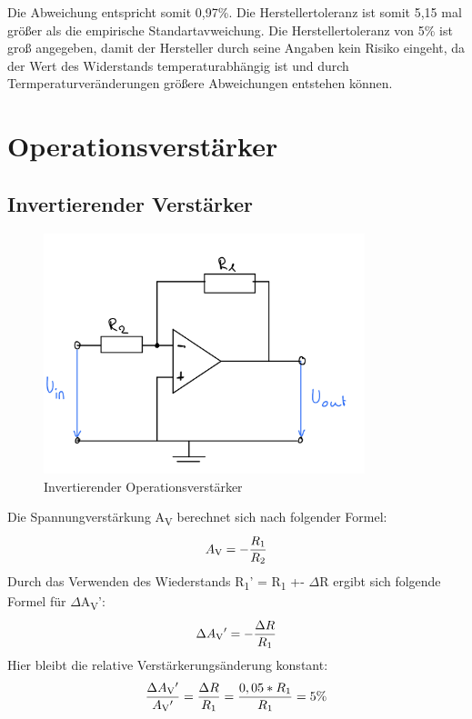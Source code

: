 Die Abweichung entspricht somit 0,97\%. Die Herstellertoleranz ist somit 5,15
mal größer als die empirische Standartavweichung. Die Herstellertoleranz 
von 5\% ist groß angegeben, damit der Hersteller durch seine Angaben
kein Risiko eingeht, da der Wert des Widerstands temperaturabhängig ist und
 durch Termperaturveränderungen größere Abweichungen entstehen können.

\section{Operationsverstärker}

\subsection{Invertierender Verstärker}
\begin{figure}[H]
	\centering
	\includegraphics[height=7cm]{images/Versuch5/invertierend-opamp.jpeg} 
	\caption{Invertierender Operationsverstärker}
	\label{fig: Invertierender Operationsverstärker}
\end{figure}
Die Spannungverstärkung A\textsubscript{V} berechnet sich nach folgender Formel:
\begin{equation}
	A\textsubscript{V} = - \frac{R\textsubscript{1}}{R\textsubscript{2}}
	\label{eq:AV2}
\end{equation}
Durch das Verwenden des Wiederstands R\textsubscript{1}' = R\textsubscript{1} +- $\Delta$R 
ergibt sich folgende Formel für $\Delta$A\textsubscript{V}':
\begin{equation}
	\Delta A\textsubscript{V}' = - \frac{\Delta R}{R\textsubscript{1}}
	\label{eq:AV2'}
\end{equation}
Hier bleibt die relative Verstärkerungsänderung konstant:
\begin{equation}
	\frac{\Delta A\textsubscript{V}'}{A\textsubscript{V}'} = \frac{\Delta R}{R\textsubscript{1}} = \frac{0,05 * R\textsubscript{1}}{R\textsubscript{1}} = 5\%
	\label{eq:AV2''}
\end{equation}

